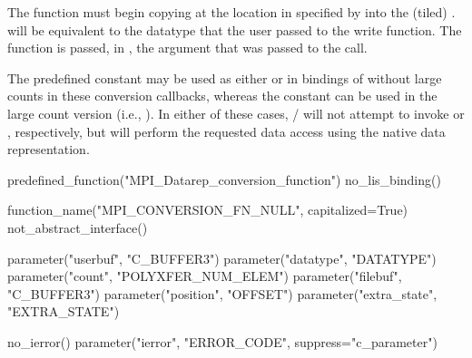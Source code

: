 The function must
begin copying at the location in  specified by
 into the (tiled) .
 will be equivalent to the datatype
that the user passed to the 
write 
function.
The function is passed, in ,
the argument that was passed to the  call.

The predefined constant 
may be used as either
 or 
in bindings of  without large counts in these conversion callbacks,
whereas the constant
can be used in the large count version
(i.e., ).
In either of these cases, \MPI/ will
not attempt to invoke  or 
, respectively, but will perform 
the requested data access using the native data representation.

\begin{mpi-binding}
    predefined_function("MPI_Datarep_conversion_function")
    no_lis_binding()
    
    function_name("MPI_CONVERSION_FN_NULL", capitalized=True)
    not_abstract_interface()
    
    parameter("userbuf", "C_BUFFER3")
    parameter("datatype", "DATATYPE")
    parameter("count", "POLYXFER_NUM_ELEM")
    parameter("filebuf", "C_BUFFER3")
    parameter("position", "OFFSET")
    parameter("extra_state", "EXTRA_STATE")
    
    no_ierror()
    parameter("ierror", "ERROR_CODE", suppress="c_parameter")
\end{mpi-binding}


